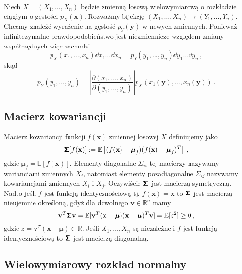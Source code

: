 \documentclass{myclass}
\begin{document}
Niech \(X = (X_1, \ldots, X_n)\) będzie zmienną losową wielowymiarową o rozkładzie ciągłym o
gęstości \(p_X(\mathbf{x})\). Rozważmy bijekcję \((X_1, \ldots, X_n) \mapsto (Y_1, \ldots, Y_n)\).
Chcemy znaleźć wyrażenie na gęstość \(p_Y(\mathbf{y})\) w nowych zmiennych. Ponieważ infinitezymalne
prawdopodobieństwo jest niezmiennicze względem zmiany współrzędnych więc zachodzi
\begin{equation*}
    p_X(x_1,\ldots, x_n)\dd{x_1}\ldots\dd{x_n} = p_Y(y_1,\ldots, y_n)\dd{y_1}\ldots\dd{y_n}\,,
\end{equation*}
skąd
\begin{equation*}
    p_Y(y_1,\ldots,y_n) = \left|\frac{\partial(x_1,\ldots,x_n)}{\partial(y_1,\ldots,y_n)}\right|p_X(x_1(\mathbf{y}),\ldots,x_n(\mathbf{y}))\,.
\end{equation*}

\subsection{Macierz kowariancji}

Macierz kowariancji funkcji \(f(\mathbf{x})\) zmiennej losowej \(X\) definiujemy jako
\begin{equation*}
    \boldsymbol{\mathsf{\Sigma}}[f(\mathbf{x})] := \mathbb{E}\left[(f(\mathbf{x}) - \boldsymbol{\mu}_f)(f(\mathbf{x}) - \boldsymbol{\mu}_f)^T\right]\,,
\end{equation*}
gdzie \(\boldsymbol{\mu}_f = \mathbb{E}[f(\mathbf{x})]\). Elementy diagonalne
\(\mathsf{\Sigma}_{ii}\) tej macierzy nazywamy wariancjami zmiennych \(X_i\), natomiast elementy
pozadiagonalne \(\mathsf{\Sigma}_{ij}\) nazywamy kowariancjami zmiennych \(X_i\) i \(X_j\).
Oczywiście \(\boldsymbol{\mathsf{\Sigma}}\) jest macierzą symetryczną. Nadto jeśli \(f\) jest funkcją
identycznościową tj. \(f(\mathbf{x}) = \mathbf{x}\) to \(\boldsymbol{\mathsf{\Sigma}}\) jest macierzą nieujemnie
określoną, gdyż dla dowolnego \(\mathbf{v} \in \mathbb{R}^n\) mamy
\begin{equation*}
    \mathbf{v}^T \boldsymbol{\mathsf{\Sigma}} \mathbf{v} = \mathbb{E}[\mathbf{v}^T (\mathbf{x} - \boldsymbol{\mu})(\mathbf{x} - \boldsymbol{\mu})^T \mathbf{v}] = \mathbb{E}[z^2] \geq 0\,,
\end{equation*}
gdzie \(z = \mathbf{v}^T (\mathbf{x} - \boldsymbol{\mu}) \in \mathbb{R}\). Jeśli \(X_1, \ldots,
X_n\) są niezależne i \(f\) jest funkcją identycznościową to \(\boldsymbol{\mathsf{\Sigma}}\) jest macierzą
diagonalną.

\subsection{Wielowymiarowy rozkład normalny}
\end{document}
